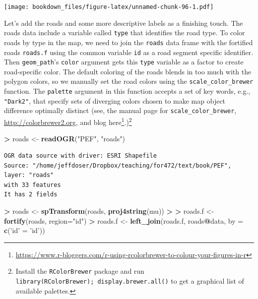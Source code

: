 \documentclass[]{krantz}
\makeatletter
\newenvironment{Shaded}{\begin{snugshade}}{\end{snugshade}}
\newcommand{\KeywordTok}[1]{\textcolor[rgb]{0.27,0.27,0.27}{\textbf{#1}}}
\newcommand{\DataTypeTok}[1]{\textcolor[rgb]{0.27,0.27,0.27}{#1}}
\newcommand{\StringTok}[1]{\textcolor[rgb]{0.5,0.5,0.5}{#1}}
\newcommand{\OperatorTok}[1]{\textcolor[rgb]{0.43,0.43,0.43}{\textbf{#1}}}
\newcommand{\ErrorTok}[1]{\textcolor[rgb]{0.14,0.14,0.14}{\textbf{#1}}}
\newcommand{\NormalTok}[1]{#1}
\renewcommand{\href}[2]{#2\footnote{\url{#1}}}
\newenvironment{kframe}{%
\medskip{}
\setlength{\fboxsep}{.8em}
 \def\at@end@of@kframe{}%
 \ifinner\ifhmode%
  \def\at@end@of@kframe{\end{minipage}}%
  \begin{minipage}{\columnwidth}%
 \fi\fi%
 \def\FrameCommand##1{\hskip\@totalleftmargin \hskip-\fboxsep
 \colorbox{shadecolor}{##1}\hskip-\fboxsep
     \hskip-\linewidth \hskip-\@totalleftmargin \hskip\columnwidth}%
 \MakeFramed {\advance\hsize-\width
   \@totalleftmargin\z@ \linewidth\hsize
   \@setminipage}}%
 {\par\unskip\endMakeFramed%
 \at@end@of@kframe}
\renewenvironment{Shaded}{\begin{kframe}}{\end{kframe}}
\theoremstyle{definition}
\theoremstyle{definition}
\theoremstyle{definition}
\theoremstyle{remark}
\makeatother
\begin{document}
\texttt{[image: bookdown\_files/figure-latex/unnamed-chunk-96-1.pdf]}

Let's add the roads and some more descriptive labels as a finishing
touch. The roads data include a variable called \texttt{type} that
identifies the road type. To color roads by type in the map, we need to
join the \texttt{roads} data frame with the fortified roads
\texttt{roads.f} using the common variable \texttt{id} as a road segment
specific identifier. Then \texttt{geom\_path}'s \texttt{color} argument
gets this \texttt{type} variable as a factor to create road-specific
color. The default coloring of the roads blends in too much with the
polygon colors, so we manually set the road colors using the
\texttt{scale\_color\_brewer} function. The \texttt{palette} argument in
this function accepts a set of key words, e.g., \texttt{"Dark2"}, that
specify sets of diverging colors chosen to make map object difference
optimally distinct (see, the manual page for
\texttt{scale\_color\_brewer}, \url{http://colorbrewer2.org}, and blog
\href{https://www.r-bloggers.com/r-using-rcolorbrewer-to-colour-your-figures-in-r}{here}.)\footnote{Install
  the \texttt{RColorBrewer} package and run
  \texttt{library(RColorBrewer);\ display.brewer.all()} to get a
  graphical list of available palettes.}

\begin{Shaded}
\begin{Highlighting}[]
\OperatorTok{>}\StringTok{ }\NormalTok{roads <-}\StringTok{ }\KeywordTok{readOGR}\NormalTok{(}\StringTok{"PEF"}\NormalTok{, }\StringTok{"roads"}\NormalTok{)}
\end{Highlighting}
\end{Shaded}

\begin{verbatim}
OGR data source with driver: ESRI Shapefile 
Source: "/home/jeffdoser/Dropbox/teaching/for472/text/book/PEF", layer: "roads"
with 33 features
It has 2 fields
\end{verbatim}

\begin{Shaded}
\begin{Highlighting}[]
\OperatorTok{>}\StringTok{ }\NormalTok{roads <-}\StringTok{ }\KeywordTok{spTransform}\NormalTok{(roads, }\KeywordTok{proj4string}\NormalTok{(mu))}
\OperatorTok{>}\StringTok{ }
\ErrorTok{>}\StringTok{ }\NormalTok{roads.f <-}\StringTok{ }\KeywordTok{fortify}\NormalTok{(roads, }\DataTypeTok{region=}\StringTok{"id"}\NormalTok{)}
\OperatorTok{>}\StringTok{ }\NormalTok{roads.f <-}\StringTok{ }\KeywordTok{left_join}\NormalTok{(roads.f, roads}\OperatorTok{@}\NormalTok{data, }\DataTypeTok{by =} \KeywordTok{c}\NormalTok{(}\StringTok{'id'}\NormalTok{ =}\StringTok{ 'id'}\NormalTok{))}
\end{Highlighting}
\end{Shaded}
\end{document}
